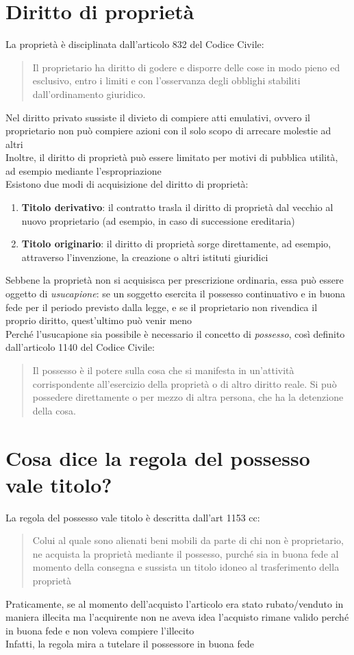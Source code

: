 \documentclass[8pt,oneside,a4paper]{article}
\begin{document}
	\section{Diritto di proprietà}
	La proprietà è disciplinata dall'articolo 832 del Codice Civile:
	\begin{quote}
		Il proprietario ha diritto di godere e disporre delle cose in modo pieno ed esclusivo, entro i limiti e con l'osservanza degli obblighi stabiliti dall'ordinamento giuridico.
	\end{quote}
	Nel diritto privato sussiste il divieto di compiere atti emulativi, ovvero il proprietario non può compiere azioni con il solo scopo di arrecare molestie ad altri\\
	Inoltre, il diritto di proprietà può essere limitato per motivi di pubblica utilità, ad esempio mediante l'espropriazione\\
	Esistono due modi di acquisizione del diritto di proprietà:
	\begin{enumerate}
		\item \textbf{Titolo derivativo}: il contratto trasla il diritto di proprietà dal vecchio al nuovo proprietario (ad esempio, in caso di successione ereditaria)
		\item \textbf{Titolo originario}: il diritto di proprietà sorge direttamente, ad esempio, attraverso l'invenzione, la creazione o altri istituti giuridici
	\end{enumerate}
	Sebbene la proprietà non si acquisisca per prescrizione ordinaria, essa può essere oggetto di \textit{usucapione}: se un soggetto esercita il possesso continuativo e in buona fede per il periodo previsto dalla legge, e se il proprietario non rivendica il proprio diritto, quest'ultimo può venir meno\\
	Perché l'usucapione sia possibile è necessario il concetto di \textit{possesso}, così definito dall'articolo 1140 del Codice Civile:
	\begin{quote}
		Il possesso è il potere sulla cosa che si manifesta in un'attività corrispondente all'esercizio della proprietà o di altro diritto reale. Si può possedere direttamente o per mezzo di altra persona, che ha la detenzione della cosa.
	\end{quote}
	\section{Cosa dice la regola del possesso vale titolo?}
	La regola del possesso vale titolo è descritta dall'art 1153 cc:
	\begin{quote}
		Colui al quale sono alienati beni mobili da parte di chi non è proprietario, ne acquista la proprietà mediante il possesso, purché sia in buona fede al momento della consegna e sussista un titolo idoneo al trasferimento della proprietà
	\end{quote}
	Praticamente, se al momento dell'acquisto l'articolo era stato rubato/venduto in maniera illecita ma l'acquirente non ne aveva idea l'acquisto rimane valido perché in buona fede e non voleva compiere l'illecito\\
	Infatti, la regola mira a tutelare il possessore in buona fede
\end{document}
